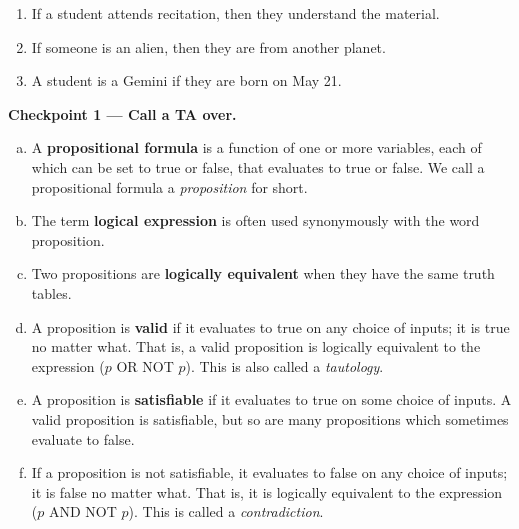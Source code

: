 \documentclass[12pt,letterpaper]{article}
\newenvironment{22enumerate}{\begin{enumerate}[a.]\itemsep0em}{\end{enumerate}}
\newif\ifsol
\begin{document}
     \begin{enumerate}
        \item If a student attends recitation, then they understand the material.
        \item If someone is an alien, then they are from another planet.
        \item A student is a Gemini if they are born on May 21.
      \end{enumerate}
      
    \ifsol
	\textbf{Answer Key:}
	\begin{enumerate}
        \item If a student does not understand the material, then they did not attend recitation. (NOT: If a student does not attend recitation, then they do not understand the material)
        \item If someone is not from another planet, then they are not an alien.
        \item If a student is not a Gemini, then they are not born on May 21. (NOT: If a student is not born on May 21, then the student is not a Gemini.)
    \end{enumerate}
	\else
    \fi

    \textbf{Checkpoint 1 — Call a TA over.}
\newpage 
\begin{22enumerate}
	
	\section*{Logic}
	
	\item A \textbf{propositional formula} is a function of one or more variables, each of which can be set to true or false, that evaluates to true or false. We call a propositional formula a \textit{proposition} for short. 
	
	\item The term \textbf{logical expression} is often used synonymously with the word proposition. 
	
	\item Two propositions are \textbf{logically equivalent} when they have  the same truth tables.
	
	\item A proposition is \textbf{valid} if it evaluates to true on any choice of inputs; it is true no matter what. That is, a valid proposition is logically equivalent to the expression ($p$ OR NOT $p$). This is also called a \textit{tautology}. 
	
	\item A proposition is \textbf{satisfiable} if it evaluates to true on some choice of inputs. A valid proposition is satisfiable, but so are many propositions which sometimes evaluate to false.
	
	\item If a proposition is not satisfiable, it evaluates to false on any choice of inputs; it is false no matter what. That is, it is logically equivalent to the expression ($p$ AND NOT $ p$). This is called a \textit{contradiction}.
	
	\end{22enumerate}
\end{document}

